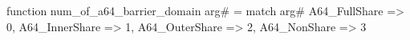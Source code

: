 function num_of_a64_barrier_domain arg# = match arg# {
  A64_FullShare => 0,
  A64_InnerShare => 1,
  A64_OuterShare => 2,
  A64_NonShare => 3
}
